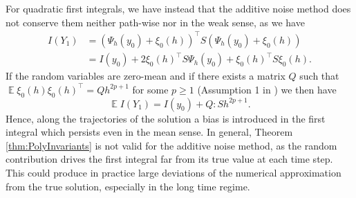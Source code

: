 \documentclass{siamart1116}
\numberwithin{theorem}{section}
\newcommand{\E}{\operatorname{\mathbb{E}}}
\begin{document}
For quadratic first integrals, we have instead that the additive noise method does not conserve them neither path-wise nor in the weak sense, as we have
\begin{equation}
\begin{aligned}
	I(Y_1) &= (\Psi_h(y_0) + \xi_0(h))^\top  S (\Psi_h(y_0) + \xi_0(h)) \\
	&= I(y_0) + 2\xi_0(h)^\top  S  \Psi_h(y_0) + \xi_0(h)^\top  S \xi_0(h).
\end{aligned}
\end{equation}
If the random variables are zero-mean and if there exists a matrix $Q$ such that $\E\xi_0(h)\xi_0(h)^\top  = Qh^{2p + 1}$ for some $p \geq 1$ (Assumption 1 in \cite{CGS16}) we then have
\begin{equation}\label{eq:BiasQuadraticAddNoise}
\E I(Y_1) = I(y_0) + Q : S h^{2p + 1}.
\end{equation}
Hence, along the trajectories of the solution a bias is introduced in the first integral which persists even in the mean sense. In general, Theorem \ref{thm:PolyInvariants} is not valid for the additive noise method, as the random contribution drives the first integral far from its true value at each time step. This could produce in practice large deviations of the numerical approximation from the true solution, especially in the long time regime.
\end{document}
